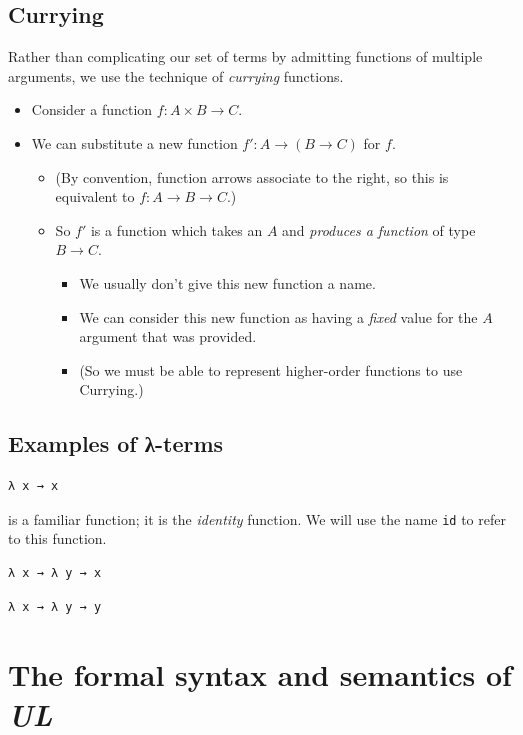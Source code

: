 \documentclass[11pt]{article}
\theoremstyle{definition}
\begin{document}
\subsection{Currying}
\label{sec:orgf57f521}
Rather than complicating our set of terms by admitting
functions of multiple arguments, we use the technique
of \emph{currying} functions.
\begin{itemize}
\item Consider a function \(f : A × B → C\).
\item We can substitute a new function \(f′ : A → (B → C)\)
for \(f\).
\begin{itemize}
\item (By convention, function arrows associate to the right,
so this is equivalent to \(f : A → B → C\).)
\item So \(f′\) is a function which takes an \(A\) and
\emph{produces a function} of type \(B → C\).
\begin{itemize}
\item We usually don't give this new function a name.
\item We can consider this new function as having a \emph{fixed} value
for the \(A\) argument that was provided.
\item (So we must be able to represent higher-order functions
to use Currying.)
\end{itemize}
\end{itemize}
\end{itemize}

\subsection{Examples of λ-terms}
\label{sec:org7fcc3a9}
\begin{verbatim}
λ x → x
\end{verbatim}
is a familiar function; it is the \emph{identity} function.
We will use the name \texttt{id} to refer to this function.

\begin{verbatim}
λ x → λ y → x
\end{verbatim}

\begin{verbatim}
λ x → λ y → y
\end{verbatim}

\section{The formal syntax and semantics of \emph{UL}}
\label{sec:org8e06c9d}
\end{document}
